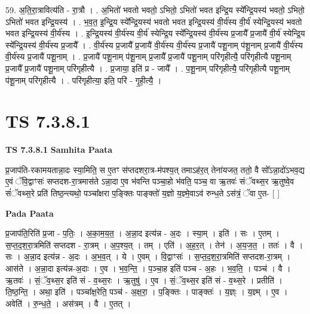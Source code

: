 \documentclass[17pt]{extarticle}
\begin{document}
59. अ॒ति॒रा॒त्रावित्य॑ति - रा॒त्रौ । . अ॒भितो॑ भवतो भवतो॒ ऽभितो॒ ऽभितो॑ भवत इन्द्रि॒य स्ये᳚न्द्रि॒यस्य॑ भवतो॒ ऽभितो॒ ऽभितो॑ भवत इन्द्रि॒यस्य॑ । . भ॒व॒त॒ इ॒न्द्रि॒य स्ये᳚न्द्रि॒यस्य॑ भवतो भवत इन्द्रि॒यस्य॑ वी॒र्य॑स्य वी॒र्य॑ स्येन्द्रि॒यस्य॑ भवतो भवत इन्द्रि॒यस्य॑ वी॒र्य॑स्य । . इ॒न्द्रि॒यस्य॑ वी॒र्य॑स्य वी॒र्य॑ स्येन्द्रि॒य स्ये᳚न्द्रि॒यस्य॑ वी॒र्य॑स्य प्र॒जायै᳚ प्र॒जायै॑ वी॒र्य॑ स्येन्द्रि॒य
स्ये᳚न्द्रि॒यस्य॑ वी॒र्य॑स्य प्र॒जायै᳚ । . वी॒र्य॑स्य प्र॒जायै᳚ प्र॒जायै॑ वी॒र्य॑स्य वी॒र्य॑स्य प्र॒जायै॑ पशू॒नाम् प॑शू॒नाम् प्र॒जायै॑ वी॒र्य॑स्य वी॒र्य॑स्य प्र॒जायै॑ पशू॒नाम् । . प्र॒जायै॑ पशू॒नाम् प॑शू॒नाम् प्र॒जायै᳚ प्र॒जायै॑ पशू॒नाम् परि॑गृहीत्यै॒ परि॑गृहीत्यै पशू॒नाम् प्र॒जायै᳚ प्र॒जायै॑ पशू॒नाम् परि॑गृहीत्यै । . प्र॒जाया॒ इति॑ प्र - जायै᳚ । . प॒शू॒नाम् परि॑गृहीत्यै॒ परि॑गृहीत्यै पशू॒नाम् प॑शू॒नाम् परि॑गृहीत्यै । . परि॑गृहीत्या॒ इति॒ परि॑ - गृ॒ही॒त्यै॒ । \newline
\pagebreak
{}

\section{ TS 7.3.8.1 }

\textbf{TS 7.3.8.1 } \newline
\textbf{Samhita Paata} \newline

प्र॒जाप॑ति-रकामयतान्ना॒दः स्या॒मिति॒ स ए॒तꣳ स॑प्तदशरा॒त्र-म॑पश्य॒त् तमाऽह॑र॒त् तेना॑यजत॒ ततो॒ वै सो᳚ऽन्ना॒दो॑ऽभव॒द्य ए॒वं ॅवि॒द्वाꣳसः॑ सप्तदश-रा॒त्रमास॑ते ऽन्ना॒दा ए॒व भ॑वन्ति पञ्चा॒हो भ॑वति॒ पञ्च॒ वा ऋ॒तवः॑ संॅवथ्स॒र ऋ॒तुष्वे॒व सं॑ॅवथ्स॒रे प्रति॑ तिष्ठ॒न्त्यथो॒ पञ्चा᳚क्षरा प॒ङ्क्तिः पाङ्क्तो॑ य॒ज्ञो य॒ज्ञ्मे॒वाऽव॑ रुन्ध॒ते ऽस॑त्रं॒ ॅवा ए॒त- [  ] \newline

\textbf{Pada Paata} \newline

प्र॒जाप॑ति॒रिति॑ प्र॒जा - प॒तिः॒ । अ॒का॒म॒य॒त॒ । अ॒न्ना॒द इत्य॑न्न - अ॒दः । स्या॒म् । इति॑ । सः । ए॒तम् । स॒प्त॒द॒श॒रा॒त्रमिति॑ सप्तदश - रा॒त्रम् । अ॒प॒श्य॒त् । तम् । एति॑ । अ॒ह॒र॒त् । तेन॑ । अ॒य॒ज॒त॒ । ततः॑ । वै । सः । अ॒न्ना॒द इत्य॑न्न - अ॒दः । अ॒भ॒व॒त् । ये । ए॒वम् । वि॒द्वाꣳसः॑ । स॒प्त॒द॒श॒रा॒त्रमिति॑ सप्तदश-रा॒त्रम् । आस॑ते । अ॒न्ना॒दा इत्य॑न्न-अ॒दाः । ए॒व । भ॒व॒न्ति॒ । प॒ञ्चा॒ह इति॑ पञ्च - अ॒हः । भ॒व॒ति॒ । पञ्च॑ । वै । ऋ॒तवः॑ । सं॒ॅव॒थ्स॒र इति॑ सं - व॒थ्स॒रः । ऋ॒तुषु॑ । ए॒व । सं॒ॅव॒थ्स॒र इति॑ सं - व॒थ्स॒रे । प्रतीति॑ । ति॒ष्ठ॒न्ति॒ । अथा॒ इति॑ । पञ्चा᳚क्ष॒रेति॒ पञ्च॑ - अ॒क्ष॒रा॒ । प॒ङ्क्तिः । पाङ्क्तः॑ । य॒ज्ञ्ः । य॒ज्ञ्म् । ए॒व । अवेति॑ । रु॒न्ध॒ते॒ । अस॑त्रम् । वै । ए॒तत् ।  \newline
\end{document}

